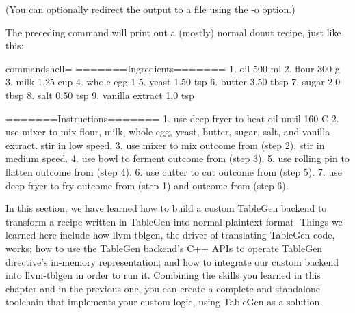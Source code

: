 \begin{itemize}
(You can optionally redirect the output to a file using the -o option.)

The preceding command will print out a (mostly) normal donut recipe, just like this:

\begin{tcblisting}{commandshell={}}
=======Ingredients=======
1. oil 500 ml
2. flour 300 g
3. milk 1.25 cup
4. whole egg 1
5. yeast 1.50 tsp
6. butter 3.50 tbsp
7. sugar 2.0 tbsp
8. salt 0.50 tsp
9. vanilla extract 1.0 tsp

=======Instructions=======
1. use deep fryer to heat oil until 160 C
2. use mixer to mix flour, milk, whole egg, yeast,
butter, sugar, salt, and vanilla extract. stir in low
speed.
3. use mixer to mix outcome from (step 2). stir in medium
speed.
4. use bowl to ferment outcome from (step 3).
5. use rolling pin to flatten outcome from (step 4).
6. use cutter to cut outcome from (step 5).
7. use deep fryer to fry outcome from (step 1) and
outcome from (step 6).
\end{tcblisting}

\end{itemize}

In this section, we have learned how to build a custom TableGen backend to transform a recipe written in TableGen into normal plaintext format. Things we learned here include how llvm-tblgen, the driver of translating TableGen code, works; how to use the TableGen backend's C++ APIs to operate TableGen directive's in-memory representation; and how to integrate our custom backend into llvm-tblgen in order to run it. Combining the skills you learned in this chapter and in the previous one, you can create a complete and standalone toolchain that implements your custom logic, using TableGen as a solution.














































